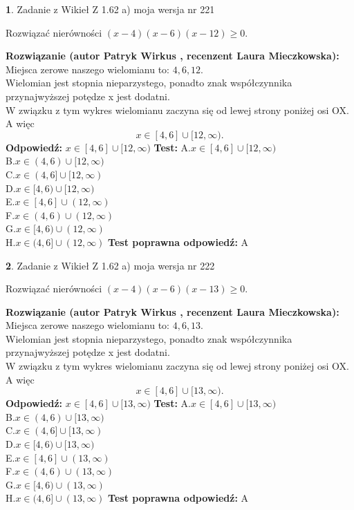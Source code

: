 \documentclass[12pt, a4paper]{article}
\theoremstyle{definition} %
\newtheorem{zad}{}
\newcommand{\zadStart}[1]{\begin{zad}#1\newline}
\newcommand{\zadStop}{\end{zad}}
\newcommand{\rozwStart}[2]{\noindent \textbf{Rozwiązanie (autor #1 , recenzent #2): }\newline}
\newcommand{\rozwStop}{\newline}
\newcommand{\odpStart}{\noindent \textbf{Odpowiedź:}\newline}
\newcommand{\odpStop}{\newline}
\newcommand{\testStart}{\noindent \textbf{Test:}\newline}
\newcommand{\testStop}{\newline}
\newcommand{\kluczStart}{\noindent \textbf{Test poprawna odpowiedź:}\newline}
\newcommand{\kluczStop}{\newline}
\begin{document}
\zadStart{Zadanie z Wikieł Z 1.62 a) moja wersja nr 221}

Rozwiązać nierówności $(x-4)(x-6)(x-12)\ge0$.
\zadStop
\rozwStart{Patryk Wirkus}{Laura Mieczkowska}
Miejsca zerowe naszego wielomianu to: $4, 6, 12$.\\
Wielomian jest stopnia nieparzystego, ponadto znak współczynnika przy\linebreak najwyższej potędze x jest dodatni.\\ W związku z tym wykres wielomianu zaczyna się od lewej strony poniżej osi OX. A więc $$x \in [4,6] \cup [12,\infty).$$
\rozwStop
\odpStart
$x \in [4,6] \cup [12,\infty)$
\odpStop
\testStart
A.$x \in [4,6] \cup [12,\infty)$\\
B.$x \in (4,6) \cup [12,\infty)$\\
C.$x \in (4,6] \cup [12,\infty)$\\
D.$x \in [4,6) \cup [12,\infty)$\\
E.$x \in [4,6] \cup (12,\infty)$\\
F.$x \in (4,6) \cup (12,\infty)$\\
G.$x \in [4,6) \cup (12,\infty)$\\
H.$x \in (4,6] \cup (12,\infty)$
\testStop
\kluczStart
A
\kluczStop



\zadStart{Zadanie z Wikieł Z 1.62 a) moja wersja nr 222}

Rozwiązać nierówności $(x-4)(x-6)(x-13)\ge0$.
\zadStop
\rozwStart{Patryk Wirkus}{Laura Mieczkowska}
Miejsca zerowe naszego wielomianu to: $4, 6, 13$.\\
Wielomian jest stopnia nieparzystego, ponadto znak współczynnika przy\linebreak najwyższej potędze x jest dodatni.\\ W związku z tym wykres wielomianu zaczyna się od lewej strony poniżej osi OX. A więc $$x \in [4,6] \cup [13,\infty).$$
\rozwStop
\odpStart
$x \in [4,6] \cup [13,\infty)$
\odpStop
\testStart
A.$x \in [4,6] \cup [13,\infty)$\\
B.$x \in (4,6) \cup [13,\infty)$\\
C.$x \in (4,6] \cup [13,\infty)$\\
D.$x \in [4,6) \cup [13,\infty)$\\
E.$x \in [4,6] \cup (13,\infty)$\\
F.$x \in (4,6) \cup (13,\infty)$\\
G.$x \in [4,6) \cup (13,\infty)$\\
H.$x \in (4,6] \cup (13,\infty)$
\testStop
\kluczStart
A
\kluczStop
\end{document}

